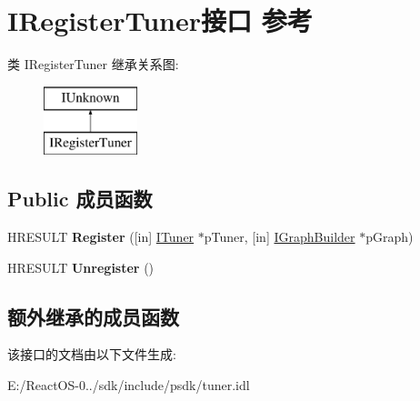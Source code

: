 \hypertarget{interface_i_register_tuner}{}\section{I\+Register\+Tuner接口 参考}
\label{interface_i_register_tuner}
类 I\+Register\+Tuner 继承关系图\+:\begin{figure}[H]
\begin{center}
\leavevmode
\includegraphics[height=2.000000cm]{interface_i_register_tuner}
\end{center}
\end{figure}
\subsection*{Public 成员函数}
\begin{DoxyCompactItemize}
\item 
\mbox{\label{interface_i_register_tuner_aa6ee52052d43388eb691cae6ff564b77}} 
H\+R\+E\+S\+U\+LT {\bfseries Register} (\mbox{[}in\mbox{]} \hyperlink{interface_i_tuner}{I\+Tuner} $\ast$p\+Tuner, \mbox{[}in\mbox{]} \hyperlink{interface_i_graph_builder}{I\+Graph\+Builder} $\ast$p\+Graph)
\item 
\mbox{\label{interface_i_register_tuner_abd44fb4ad992a00ed0d52c3397824894}} 
H\+R\+E\+S\+U\+LT {\bfseries Unregister} ()
\end{DoxyCompactItemize}
\subsection*{额外继承的成员函数}


该接口的文档由以下文件生成\+:\begin{DoxyCompactItemize}
\item 
E\+:/\+React\+O\+S-\/0../sdk/include/psdk/tuner.\+idl\end{DoxyCompactItemize}

